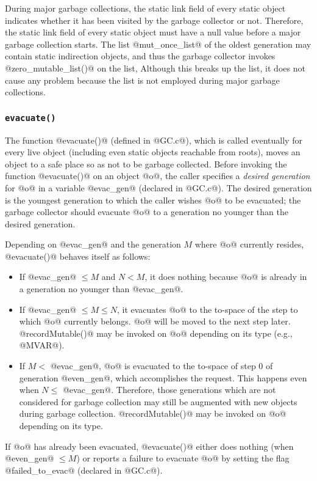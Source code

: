 \documentclass{article}
\begin{document}
During major garbage collections,
the static link field of every static object indicates whether it has
been visited by the garbage collector or not.
Therefore, the static link field of every static object must have
a null value before a major garbage collection starts. 
The list @mut_once_list@ of the oldest generation may contain static 
indirection objects, and thus 
the garbage collector invokes @zero_mutable_list()@ on the list,
Although this breaks up the list, it does not cause any problem because 
the list is not employed during major garbage collections.

\subsubsection{\tt evacuate()}

The function @evacuate()@ (defined in @GC.c@), which 
is called eventually for every live object 
(including even static objects reachable from roots),
moves an object to
a safe place so as not to be garbage collected.
Before invoking the function @evacuate()@ on an object @o@, the caller specifies
a \emph{desired generation} for @o@ in a variable @evac_gen@
(declared in @GC.c@).
The desired generation is the youngest generation to which the caller wishes 
@o@ to be evacuated; the garbage collector should evacuate @o@ to a 
generation no younger than the desired generation.

Depending on @evac_gen@ and the generation $M$ where @o@ currently resides,
@evacuate()@ behaves itself as follows:
\begin{itemize}
\item If @evac_gen@ $\leq M$ and $N < M$, it does nothing because @o@ is already
      in a generation no younger than @evac_gen@.
\item If @evac_gen@ $\leq M \leq N$, it evacuates @o@ to the to-space of the 
step to which @o@ currently belongs. @o@ will be moved to the next step later.
@recordMutable()@ may be invoked on @o@ depending on its type (e.g., @MVAR@).
\item If $M <$ @evac_gen@, @o@ is evacuated to the to-space of step $0$
      of generation @even_gen@, which accomplishes the request.
      This happens even when $N \leq$ @evac_gen@. Therefore, those generations
      which are not considered for garbage collection may still be augmented
      with new objects during garbage collection.
      @recordMutable()@ may be invoked on @o@ depending on its type.
\end{itemize}
If @o@ has already been evacuated, @evacuate()@ either does nothing (when
@even_gen@ $\leq M$) or reports
a failure to evacuate @o@ by setting the flag @failed_to_evac@ (declared
in @GC.c@). 
\end{document}
